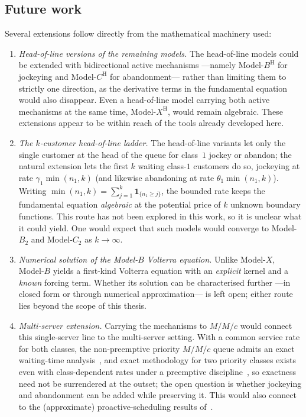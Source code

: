 \subsection{Future work}\label{sec:future_work}

Several extensions follow directly from the mathematical machinery used:
\begin{enumerate}
  \item \emph{Head-of-line versions of the remaining models.} The head-of-line models could be extended with bidirectional active mechanisms ---namely Model-$B^\mathrm{H}$ for jockeying and Model-$C^\mathrm{H}$ for abandonment--- rather than limiting them to strictly one direction, as the derivative terms in the fundamental equation would also disappear. Even a head-of-line model carrying both active mechanisms at the same time, Model-$X^\mathrm{H}$, would remain algebraic. These extensions appear to be within reach of the tools already developed here.
  \item \emph{The $k$-customer head-of-line ladder.} The head-of-line variants let only the single customer at the head of the queue for class~$1$ jockey or abandon; the natural extension lets the first $k$ waiting class-$1$ customers do so, jockeying at rate $\gamma_1\min(n_1,k)$ (and likewise abandoning at rate $\theta_1\min(n_1,k)$). Writing $\min(n_1,k)=\sum_{j=1}^{k}\mathbf 1_{\{n_1\ge j\}}$, the bounded rate keeps the fundamental equation \emph{algebraic} at the potential price of $k$ unknown boundary functions. This route has not been explored in this work, so it is unclear what it could yield. One would expect that such models would converge to Model-$B_2$ and Model-$C_2$ as $k\to\infty$.
  \item \emph{Numerical solution of the Model-$B$ Volterra equation.} Unlike Model-$X$, Model-$B$ yields a first-kind Volterra equation with an \emph{explicit} kernel and a \emph{known} forcing term. Whether its solution can be characterised further ---in closed form or through numerical approximation--- is left open; either route lies beyond the scope of this thesis.
  \item \emph{Multi-server extension.} Carrying the mechanisms to $M/M/c$ would connect this single-server line to the multi-server setting. With a common service rate for both classes, the non-preemptive priority $M/M/c$ queue admits an exact waiting-time analysis~\cite{kella1985waiting}, and exact methodology for two priority classes exists even with class-dependent rates under a preemptive discipline~\cite{wang2015mmc}, so exactness need not be surrendered at the outset; the open question is whether jockeying and abandonment can be added while preserving it. This would also connect to the (approximate) proactive-scheduling results of~\cite{huchandong2022proactive}.

\end{enumerate}
